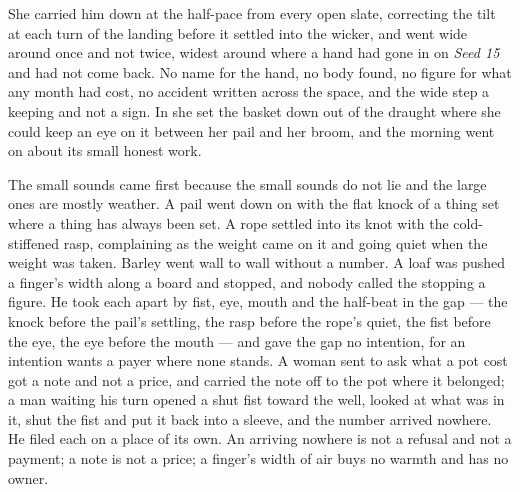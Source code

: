 \scenebreak

She carried him down  at the half-pace from every open slate, correcting the tilt at each turn of the landing before it settled into the wicker, and went wide around  once and not twice, widest around  where a hand had gone in on \emph{Seed 15} and had not come back. No name for the hand, no body found, no figure for what any month had cost, no accident written across the space, and the wide step a keeping and not a sign. In  she set the basket down out of the draught where she could keep an eye on it between her pail and her broom, and the morning went on about its small honest work.

The small sounds came first because the small sounds do not lie and the large ones are mostly weather. A pail went down on  with the flat knock of a thing set where a thing has always been set. A rope settled into its knot with the cold-stiffened rasp, complaining as the weight came on it and going quiet when the weight was taken. Barley went wall to wall without a number. A loaf was pushed a finger's width along a board and stopped, and nobody called the stopping a figure. He took each apart by fist, eye, mouth and the half-beat in the gap --- the knock before the pail's settling, the rasp before the rope's quiet, the fist before the eye, the eye before the mouth --- and gave the gap no intention, for an intention wants a payer where none stands. A woman sent to ask what a pot cost got a note and not a price, and carried the note off to the pot where it belonged; a man waiting his turn opened a shut fist toward the well, looked at what was in it, shut the fist and put it back into a sleeve, and the number arrived nowhere. He filed each on a place of its own. An arriving nowhere is not a refusal and not a payment; a note is not a price; a finger's width of air buys no warmth and has no owner.

